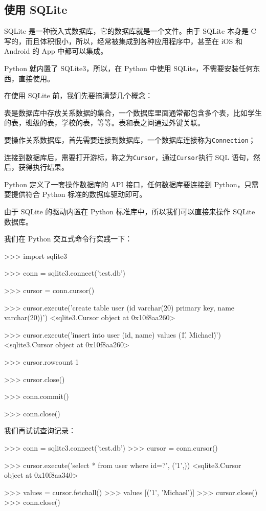 \hypertarget{ux4f7fux7528-sqlite}{%
\subsection{使用 SQLite}\label{ux4f7fux7528-sqlite}}

SQLite 是一种嵌入式数据库，它的数据库就是一个文件。由于 SQLite 本身是 C
写的，而且体积很小，所以，经常被集成到各种应用程序中，甚至在 iOS 和
Android 的 App 中都可以集成。

Python 就内置了 SQLite3，所以，在 Python 中使用
SQLite，不需要安装任何东西，直接使用。

在使用 SQLite 前，我们先要搞清楚几个概念：

表是数据库中存放关系数据的集合，一个数据库里面通常都包含多个表，比如学生的表，班级的表，学校的表，等等。表和表之间通过外键关联。

要操作关系数据库，首先需要连接到数据库，一个数据库连接称为\texttt{Connection}；

连接到数据库后，需要打开游标，称之为\texttt{Cursor}，通过\texttt{Cursor}执行
SQL 语句，然后，获得执行结果。

Python 定义了一套操作数据库的 API 接口，任何数据库要连接到
Python，只需要提供符合 Python 标准的数据库驱动即可。

由于 SQLite 的驱动内置在 Python 标准库中，所以我们可以直接来操作 SQLite
数据库。

我们在 Python 交互式命令行实践一下：

\begin{pythoncode}
>>> import sqlite3

>>> conn = sqlite3.connect('test.db')

>>> cursor = conn.cursor()

>>> cursor.execute('create table user (id varchar(20) primary key, name varchar(20))')
<sqlite3.Cursor object at 0x10f8aa260>

>>> cursor.execute('insert into user (id, name) values (\'1\', \'Michael\')')
<sqlite3.Cursor object at 0x10f8aa260>

>>> cursor.rowcount
1

>>> cursor.close()

>>> conn.commit()

>>> conn.close()
\end{pythoncode}

我们再试试查询记录：

\begin{pythoncode}
>>> conn = sqlite3.connect('test.db')
>>> cursor = conn.cursor()

>>> cursor.execute('select * from user where id=?', ('1',))
<sqlite3.Cursor object at 0x10f8aa340>

>>> values = cursor.fetchall()
>>> values
[('1', 'Michael')]
>>> cursor.close()
>>> conn.close()
\end{pythoncode}

